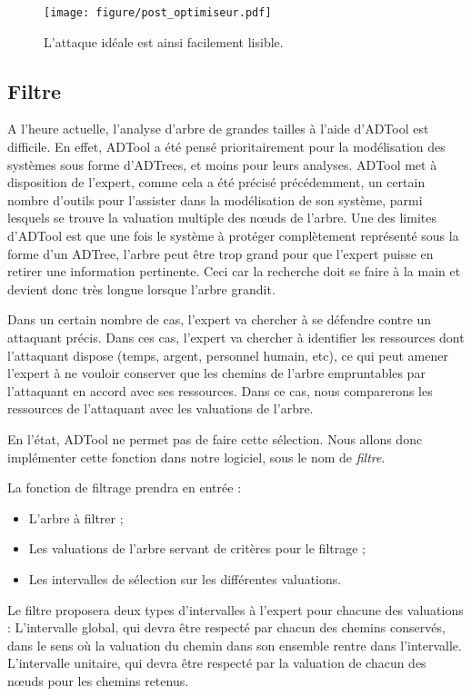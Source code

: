		\begin{figure}
			\centering
			\texttt{[image: figure/post\_optimiseur.pdf]}
			\caption{L'attaque idéale est ainsi facilement lisible.}
			\label{fig:arbre_post_opti}
		\end{figure}


	\subsection{Filtre}

		A l'heure actuelle, l'analyse d'arbre de grandes tailles à l'aide d'ADTool est difficile. 
		En effet, ADTool a été pensé prioritairement pour la modélisation des systèmes sous forme d'ADTrees, et moins pour leurs analyses. 
		ADTool met à disposition de l'expert, comme cela a été précisé précédemment, un certain nombre d'outils pour l'assister dans la modélisation de son système, parmi lesquels se trouve la valuation multiple des nœuds de l'arbre. 
		Une des limites d'ADTool est que une fois le système à protéger complètement représenté sous la forme d'un ADTree, l'arbre peut être trop grand pour que l'expert puisse en retirer une information pertinente. Ceci car la recherche doit se faire à la main et devient donc très longue lorsque l'arbre grandit. 

		Dans un certain nombre de cas, l'expert va chercher à se défendre contre un attaquant précis. Dans ces cas, l'expert va chercher à identifier les ressources dont l'attaquant dispose (temps, argent, personnel humain, etc), ce qui peut amener l'expert à ne vouloir conserver que les chemins de l'arbre empruntables par l'attaquant en accord avec ses ressources. Dans ce cas, nous comparerons les ressources de l'attaquant avec les valuations de l'arbre.

		En l'état, ADTool ne permet pas de faire cette sélection. Nous allons donc implémenter cette fonction dans notre logiciel, sous le nom de \textit{filtre}.

		La fonction de filtrage prendra en entrée : 
		\begin{itemize}
		\item L'arbre à filtrer ;
		\item Les valuations de l'arbre servant de critères pour le filtrage ;
		\item Les intervalles de sélection sur les différentes valuations.
		\end{itemize}

		Le filtre proposera deux types d'intervalles à l'expert pour chacune des valuations :
		L'intervalle global, qui devra être respecté par chacun des chemins conservés, dans le sens où la valuation du chemin dans son ensemble rentre dans l'intervalle.
		L'intervalle unitaire, qui devra être respecté par la valuation de chacun des nœuds pour les chemins retenus.

